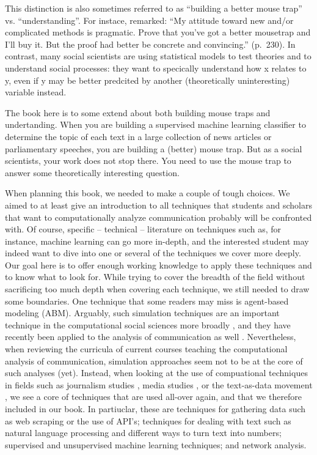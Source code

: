 This distinction is also sometimes referred to as ``building a better
mouse trap'' vs. ``understanding''. For instace, \cite{Breiman2001}
remarked: ``My attitude toward new and/or complicated methods is
pragmatic. Prove that you've got a better mousetrap and I'll buy
it. But the proof had better be concrete and convincing.''
(p.~230). In contrast, many social scientists are using statistical
models to test theories and to understand social processes: they want
to specically understand how x relates to y, even if y may be better
predcited by another (theoretically uninteresting) variable instead.

The book here is to some extend about both building mouse traps and undertanding. When you
are building a supervised machine learning classifier to determine the
topic of each text in a large collection of news articles or
parliamentary speeches, you are building a (better) mouse trap. But as
a social scientists, your work does not stop there. You need to use
the mouse trap to answer some theoretically interesting question.



When planning this book, we needed to make a couple of tough
choices. We aimed to at least give an introduction to all techniques
that students and scholars that want to computationally analyze
communication probably will be confronted with. Of course, specific --
technical -- literature on techniques such as, for instance, machine
learning can go more in-depth, and the interested student may indeed
want to dive into one or several of the techniques we cover more
deeply. Our goal here is to offer enough working knowledge to apply
these techniques and to know what to look for.  While trying to cover
the breadth of the field without sacrificing too much depth when
covering each technique, we still needed to draw some boundaries. One
technique that some readers may miss is agent-based modeling
(ABM). Arguably, such simulation techniques are an important technique
in the computational social sciences more broadly
\citep{cioffi-revilla2014}, and they have recently been applied to the
analysis of communication as well
\citep{Waldherr2014,Wettstein2020}. Nevertheless, when reviewing the
curricula of current courses teaching the computational analysis of
communication, simulation approaches seem not to be at the core of
such analyses (yet).  Instead, when looking at the use of compuational
techniques in fields such as journalism studies
\citep[e.g.,][]{Boumans2016}, media studies \citep[e.g.,][]{Rieder2017}, or
the text-as-data movement \citep{Grimmer2013}, we see a core of
techniques that are used all-over again, and that we therefore
included in our book. In partiuclar, these are techniques for
gathering data such as web scraping or the use of API's; techniques
for dealing with text such as natural language processing and
different ways to turn text into numbers; supervised and unsupervised
machine learning techniques; and network analysis.



